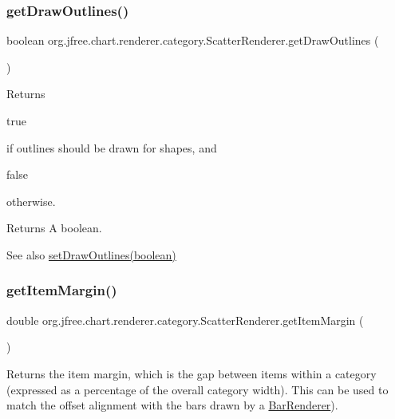 \subsubsection{\texorpdfstring{get\+Draw\+Outlines()}{getDrawOutlines()}}
{\footnotesize\ttfamily boolean org.\+jfree.\+chart.\+renderer.\+category.\+Scatter\+Renderer.\+get\+Draw\+Outlines (\begin{DoxyParamCaption}{ }\end{DoxyParamCaption})}

Returns
\begin{DoxyCode}
\textcolor{keyword}{true} 
\end{DoxyCode}
 if outlines should be drawn for shapes, and 
\begin{DoxyCode}
\textcolor{keyword}{false} 
\end{DoxyCode}
 otherwise.

\begin{DoxyReturn}{Returns}
A boolean.
\end{DoxyReturn}
\begin{DoxySeeAlso}{See also}
\mbox{\hyperlink{classorg_1_1jfree_1_1chart_1_1renderer_1_1category_1_1_scatter_renderer_a7abfe3403b5c744918c537dcf97dd09b}{set\+Draw\+Outlines(boolean)}} 
\end{DoxySeeAlso}
\mbox{\label{classorg_1_1jfree_1_1chart_1_1renderer_1_1category_1_1_scatter_renderer_a04492c88e6bffca4048e638d89d6ef6d}} 
\subsubsection{\texorpdfstring{get\+Item\+Margin()}{getItemMargin()}}
{\footnotesize\ttfamily double org.\+jfree.\+chart.\+renderer.\+category.\+Scatter\+Renderer.\+get\+Item\+Margin (\begin{DoxyParamCaption}{ }\end{DoxyParamCaption})}

Returns the item margin, which is the gap between items within a category (expressed as a percentage of the overall category width). This can be used to match the offset alignment with the bars drawn by a \mbox{\hyperlink{classorg_1_1jfree_1_1chart_1_1renderer_1_1category_1_1_bar_renderer}{Bar\+Renderer}}).

